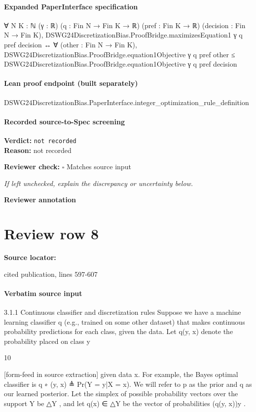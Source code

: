 \documentclass[10pt]{article}
\newcommand{\reviewerbox}{%
  \par\noindent\fbox{\parbox{0.96\linewidth}{\rule{0pt}{0.38in}}}\par
}
\newcommand{\reviewmatch}[1]{%
  \par\noindent\textbf{Reviewer check:} $\square$\; #1\par
  \noindent\emph{If left unchecked, explain the discrepancy or uncertainty below.}\par
}
\begin{document}
\paragraph{Expanded PaperInterface specification}
\begin{ReviewVerbatim}
∀ {N K : ℕ} (γ : ℝ) (q : Fin N → Fin K → ℝ) (pref : Fin K → ℝ) (decision : Fin N → Fin K),
  DSWG24DiscretizationBias.ProofBridge.maximizesEquation1 γ q pref decision ↔
    ∀ (other : Fin N → Fin K),
      DSWG24DiscretizationBias.ProofBridge.equation1Objective γ q pref other ≤
        DSWG24DiscretizationBias.ProofBridge.equation1Objective γ q pref decision
\end{ReviewVerbatim}

\paragraph{Lean proof endpoint (built separately)}\begin{ReviewVerbatim}
DSWG24DiscretizationBias.PaperInterface.integer_optimization_rule_definition
\end{ReviewVerbatim}

\paragraph{Recorded source-to-Spec screening}
\textbf{Verdict:} \texttt{not recorded}
\\
\textbf{Reason:} not recorded
\reviewmatch{Matches source input}
\noindent\textbf{Reviewer annotation}\par
\reviewerbox
\clearpage
\hypertarget{source-claim-ec32b7cd29afa460}{}
\section*{Review row 8}
\textbf{Source locator:} {\footnotesize\raggedright cited publication, lines 597-\allowbreak{}607\par}
\paragraph{Verbatim source input}
\begin{ReviewVerbatim}
3.1.1    Continuous classifier and discretization rules
Suppose we have a machine learning classifier q (e.g., trained on some other dataset) that makes continuous
probability predictions for each class, given the data. Let q(y, x) denote the probability placed on class y



                                                       10

[form-feed in source extraction]
given data x. For example, the Bayes optimal classifier is
                                               q ∗ (y, x) ≜ Pr(Y = y|X = x).
We will refer to p as the prior and q as our learned posterior. Let the simplex of possible probability vectors
over the support Y be △Y , and let q(x) ∈ △Y be the vector of probabilities (q(y, x))y .
\end{ReviewVerbatim}
\end{document}
